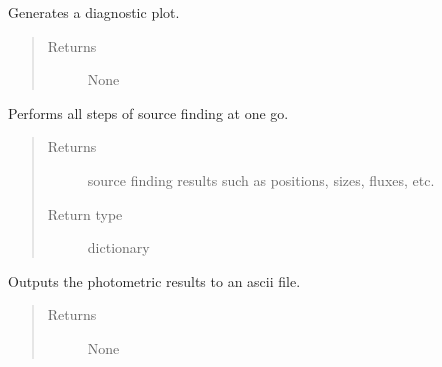 \documentclass[a4paper,12pt,english]{sphinxmanual}
\begin{document}
\begin{fulllineitems}
\begin{fulllineitems}
\label{analysis:analysis.sourceFinder.sourceFinder.plot}
Generates a diagnostic plot.
\begin{quote}\begin{description}
\item[{Returns}] \leavevmode
None

\end{description}\end{quote}

\end{fulllineitems}


\begin{fulllineitems}
\label{analysis:analysis.sourceFinder.sourceFinder.runAll}
Performs all steps of source finding at one go.
\begin{quote}\begin{description}
\item[{Returns}] \leavevmode
source finding results such as positions, sizes, fluxes, etc.

\item[{Return type}] \leavevmode
dictionary

\end{description}\end{quote}

\end{fulllineitems}


\begin{fulllineitems}
\label{analysis:analysis.sourceFinder.sourceFinder.writePhotometry}
Outputs the photometric results to an ascii file.
\begin{quote}\begin{description}
\item[{Returns}] \leavevmode
None

\end{description}\end{quote}

\end{fulllineitems}


\end{fulllineitems}
\end{document}
